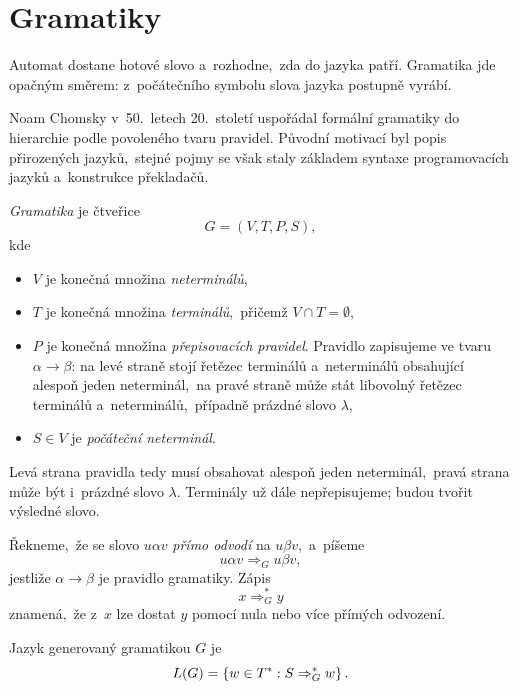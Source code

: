 \section{Gramatiky}\label{sec:gramatiky}

Automat dostane hotové slovo a~rozhodne,~zda do jazyka patří. Gramatika jde opačným směrem: z~počátečního symbolu slova jazyka postupně vyrábí.

\begin{remark}
    Noam Chomsky v~50.~letech 20.~století uspořádal formální gramatiky do hierarchie podle povoleného tvaru pravidel. Původní motivací byl popis přirozených jazyků,~stejné pojmy se však staly základem syntaxe programovacích jazyků a~konstrukce překladačů.
\end{remark}

\begin{definition}[Gramatika]
    \emph{Gramatika} je čtveřice
    \[
        G=(V,T,P,S),
    \]
    kde
    \begin{itemize}
        \item $V$ je konečná množina \emph{neterminálů},
        \item $T$ je konečná množina \emph{terminálů},~přičemž $V\cap T=\emptyset$,
        \item $P$ je konečná množina \emph{přepisovacích pravidel}. Pravidlo zapisujeme ve tvaru $\alpha\to\beta$: na levé straně stojí řetězec terminálů a~neterminálů obsahující alespoň jeden neterminál,~na pravé straně může stát libovolný řetězec terminálů a~neterminálů,~případně prázdné slovo $\lambda$,
        \item $S\in V$ je \emph{počáteční neterminál}.
    \end{itemize}
\end{definition}

Levá strana pravidla tedy musí obsahovat alespoň jeden neterminál,~pravá strana může být i~prázdné slovo $\lambda$. Terminály už dále nepřepisujeme; budou tvořit výsledné slovo.

\begin{definition}
    Řekneme,~že se slovo $u\alpha v$ \emph{přímo odvodí} na $u\beta v$,~a~píšeme
    \[
        u\alpha v\Rightarrow_G u\beta v,
    \]
    jestliže $\alpha\to\beta$ je pravidlo gramatiky. Zápis
    \[
        x\Rightarrow_G^*y
    \]
    znamená,~že z~$x$ lze dostat $y$ pomocí nula nebo více přímých odvození.

    Jazyk generovaný gramatikou $G$ je
    \[
        L(G)=\left\{w\in T^*:S\Rightarrow_G^*w\right\}.
    \]
\end{definition}

